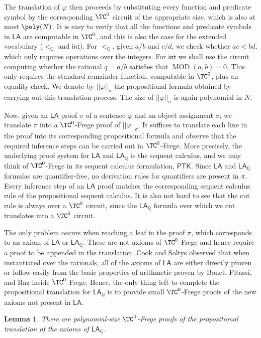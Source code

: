 \documentclass[11pt]{article}
\newcommand{\LA}{\mathsf{LA}}
\newcommand{\LAint}{\mathsf{int}}
\theoremstyle{definition}
\theoremstyle{plain}
\newtheorem{lemma}[definition]{Lemma}
\theoremstyle{remark}
\newcommand{\bQ}{\mathbb{Q}}
\begin{document}
The translation of $\varphi$ then proceeds by substituting every function and predicate symbol by the corresponding $\TC^0$ circuit of the appropriate size, which is also at most $\poly(N)$. It is easy to verify that all the functions and predicate symbols in $\LA$ are computable in $\TC^0$, and this is also the case for the extended vocabulary ($<_\bQ$ and $\LAint$). For $<_\bQ$, given $a/b$ and $c/d$, we check whether $ac < bd$, which only requires operations over the integers. For $\LAint$ we shall use the circuit computing whether the rational $q = a/b$ satisfies that $\operatorname{MOD}(a, b) = 0$. This only requires the standard remainder function, computable in $\TC^0$, plus an equality check. We denote by $||\varphi||_\sigma$ the propositional formula obtained by carrying out this translation process. The size of $||\varphi||_\sigma$ is again polynomial in $N$.

Now, given an $\LA$ proof $\pi$ of a sentence $\varphi$ and an object assignment $\sigma$, we translate $\pi$ into a $\TC^0$-Frege proof of $||\varphi||_\sigma$. It suffices to translate each line in the proof into its corresponding propositional formula and observe that the required inference steps can be carried out in $\TC^0$-Frege. More precisely, the underlying proof system for $\LA$ and $\LA_\bQ$ is the sequent calculus, and we may think of $\TC^0$-Frege in its sequent calculus formulation, $\mathsf{PTK}$. Since $\LA$ and $\LA_\bQ$ formulas are quantifier-free, no derivation rules for quantifiers are present in $\pi$. Every inference step of an $\LA$ proof matches the corresponding sequent calculus rule of the propositional sequent calculus. It is also not hard to see that the cut rule is always over a $\TC^0$ circuit, since the $\LA_\bQ$ formula over which we cut translates into a $\TC^0$ circuit.

The only problem occurs when reaching a leaf in the proof $\pi$, which corresponds to an axiom of $\LA$ or $\LA_\bQ$. These are not axioms of $\TC^0$-Frege and hence require a proof to be appended in the translation. Cook and Soltys observed that when instantiated over the rationals, all of the axioms of $\LA$ are either directly proven or follow easily from the basic properties of arithmetic proven by Bonet, Pitassi, and Raz \cite{BPR1997} inside $\TC^0$-Frege. Hence, the only thing left to complete the propositional translation for $\LA_\bQ$ is to provide small $\TC^0$-Frege proofs of the new axioms not present in $\LA$.

\begin{lemma}
\label{lem:translation-new}
    There are polynomial-size $\TC^0$-Frege proofs of the propositional translation of the axioms of $\LA_\bQ$.
\end{lemma}
\end{document}
